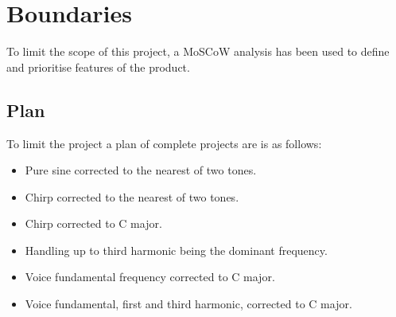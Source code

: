 
\chapter{Boundaries}
\label{sec:Boundaries}
To limit the scope of this project, a MoSCoW analysis has been used to define and prioritise features of the product.

\section{Plan}
To limit the project a plan of complete projects are is as follows:

\begin{itemize}
	\item Pure sine corrected to the nearest of two tones.
	\item Chirp corrected to the nearest of two tones.
	\item Chirp corrected to C major.
	\item Handling up to third harmonic being the dominant frequency.
	\item Voice fundamental frequency corrected to C major.
	\item Voice fundamental, first and third harmonic, corrected to C major.
\end{itemize}